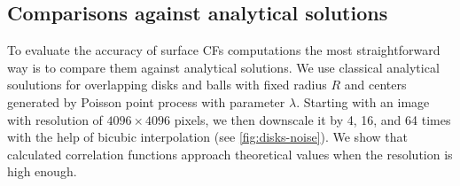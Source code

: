 \documentclass[reprint,amsmath,amssymb,aps,pre,showkeys,showpacs]{revtex4-1}
\begin{document}
\subsection{Comparisons against analytical solutions}
\label{sec:comparison}
To evaluate the accuracy of surface CFs computations the most straightforward
way is to compare them against analytical solutions. We use classical
analytical soulutions for overlapping disks and balls with fixed radius $R$ and
centers generated by Poisson point process with parameter $\lambda$. Starting
with an image with resolution of $4096 \times 4096$ pixels, we then downscale it
by 4, 16, and 64 times with the help of bicubic interpolation
\cite{ledesma2018effect} (see \cref{fig:disks-noise}). We show that calculated
correlation functions approach theoretical values when the resolution is high
enough.
\begin{figure}[!pt]
  \centering
  \hfill
  \hfill
  \hfill
  \subfigure[Image size $64 \times 64$, disk radius 0.96 pixels, $C_{0.5} = 0.6549$]{
}
\end{figure}
\end{document}
